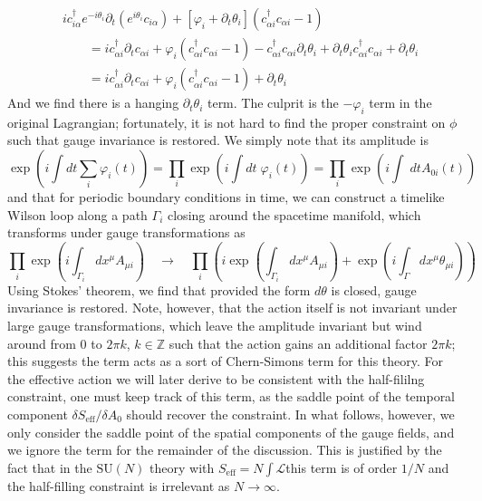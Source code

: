 \documentclass{report}
\begin{document}
\begin{align*}
	& i c^{\dagger}_{i\alpha}e^{-i\theta_i} \partial_t (e^{i\theta_i} c_{i\alpha})
		+ [\varphi_i + \partial_t \theta_i] (c^{\dagger}_{\alpha i} c_{\alpha i} - 1)\\
	&\qquad = 
		ic^\dagger_{\alpha i}\partial_t c_{\alpha i}
		+\varphi_i (c^\dagger_{\alpha i}c_{\alpha i} - 1)
			 - c^\dagger_{\alpha i} c_{\alpha i} \partial_t \theta_i 
			 + \partial_t\theta_i c_{\alpha i}^\dagger c_{\alpha i} 
			+ \partial_t \theta_i\\
	&\qquad = 
		ic^\dagger_{\alpha i}\partial_t c_{\alpha i}
		+\varphi_i (c^\dagger_{\alpha i}c_{\alpha i} - 1)
			+ \partial_t \theta_i
\end{align*}
And we find there is a hanging $ \partial_t \theta_i $ term. The culprit 
is the $ -\varphi_i $ term in the original Lagrangian; fortunately, it is 
not hard to find the proper constraint on $ \phi $ such that gauge invariance 
is restored. We simply note that its amplitude is 
\begin{equation*}
	\exp\left(i\int dt \sum_i \varphi_i(t)\right) 
		= \prod_i \exp \left(i\int dt \;\varphi_i(t)\right)
		= \prod_i \exp \left(i\int\; dt A_{0i}(t) \right)
\end{equation*}
and that for periodic boundary conditions in time, we can construct a timelike 
Wilson loop along a path $ \Gamma_i $ closing around the spacetime manifold,
which transforms under gauge transformations as
\begin{equation*}
	\prod_i \exp\left(i\int_{\Gamma_i} dx^\mu A_{\mu i}\right)
		\quad \rightarrow \quad 
	\prod_i \left(i\exp\left(\int_{\Gamma_i} dx^\mu A_{\mu i}\right)
	 + \exp\left(i\int_\Gamma dx^\mu \theta_{\mu i}\right)
	 \right)
\end{equation*}
Using Stokes' theorem, we find that provided the form $ d\theta $ is closed, 
gauge invariance is restored. Note, however, that the action itself is not 
invariant under large gauge transformations, which leave the amplitude invariant 
but wind around from $ 0 $ to $ 2\pi k $, $ k\in \mathbb{Z} $ such that 
the action gains an additional factor $ 2\pi k $; this suggests the term acts
as a sort of Chern-Simons term for this theory. For the effective action we will
later derive to be consistent with the half-fililng constraint, one must keep
track of this term, as the saddle point of the temporal component $ \delta
S_{\text{eff}} /\delta A_0 $ should recover the constraint. In what follows,
however, we only consider the saddle point of the spatial components of the 
gauge fields, and we ignore the term for the remainder of the discussion.
This is justified by the fact that in the $ \text{SU}(N) $ theory with $
S_{\text{eff}} = N\int \mathcal{L} $this term is of order $ 1/N $ and the
half-filling constraint is irrelevant as $ N \rightarrow \infty $. 
\end{document}
